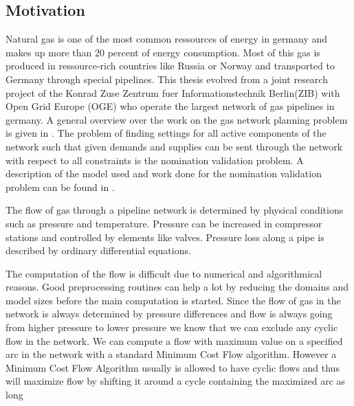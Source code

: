 \subsection{Motivation}
Natural gas is one of the most common ressources of energy in germany and makes up more than 20 percent of energy 
consumption. Most of this gas is produced in ressource-rich countries like Russia or Norway and transported to Germany 
through special pipelines. 
This thesis evolved from a joint research project of the Konrad Zuse Zentrum fuer Informationstechnik Berlin(ZIB) with 
Open Grid Europe (OGE) who operate the largest network of gas pipelines in germany. 
A general overview over the work on the gas network planning problem is given in 
\cite{FuegenschuhGeisslerGollmeretal.2013}. The problem of finding settings for all active components of the network 
such that given demands and supplies can be sent through the network with respect to all constraints is the nomination 
validation problem. A description of the model used and work done for the nomination validation problem can be 
found in \cite{PfetschFuegenschuhGeissleretal.2012}. 

The flow of gas through a pipeline network is determined by physical conditions such as pressure and temperature. 
Pressure can be increased in compressor stations and controlled by elements like valves. Pressure loss along a pipe is 
described by ordinary differential equations. 

The computation of the flow is difficult due to numerical and algorithmical reasons. Good preprocessing 
routines can help a lot by reducing the domains and model sizes before the main computation is started.
Since the flow of gas in the network is always determined by pressure differences and flow is always going from higher 
pressure to lower pressure we know that we can exclude any cyclic flow in the network. We can compute a flow with 
maximum value on a specified arc in the network with a standard Minimum Cost Flow algorithm. 
However a Minimum Cost Flow Algorithm usually is allowed to have cyclic flows and thus will maximize flow by shifting 
it around a cycle containing the maximized arc as long 
